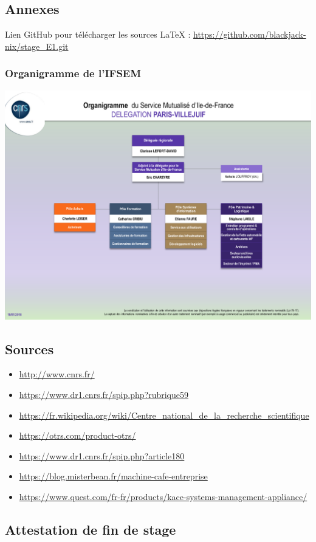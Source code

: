 \subsection{Annexes}
Lien GitHub pour télécharger les sources LaTeX : 
\url{https://github.com/blackjack-nix/stage_E1.git}
\subsubsection{Organigramme de l'IFSEM}
\centerline{\includegraphics[width=15cm]{./images/ifsemorga.png}}

\subsection{Sources}
\begin{itemize}
    \item \url{http://www.cnrs.fr/}
    \item \url{https://www.dr1.cnrs.fr/spip.php?rubrique59}
    \item \url{https://fr.wikipedia.org/wiki/Centre_national_de_la_recherche_scientifique}
    \item \url{https://otrs.com/product-otrs/}
    \item \url{https://www.dr1.cnrs.fr/spip.php?article180}
    \item \url{https://blog.misterbean.fr/machine-cafe-entreprise}
    \item \url{https://www.quest.com/fr-fr/products/kace-systems-management-appliance/}
\end{itemize}
\newpage
\subsection{Attestation de fin de stage}
\newpage
